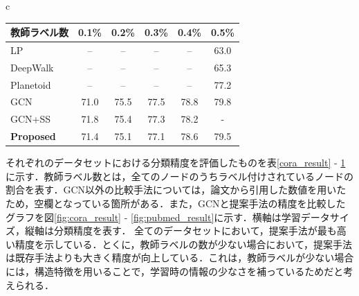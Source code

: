 \begin{table}[h]
\begin{center}
\begin{tabular}{c}
    
      
          \begin{minipage}{0.7\hsize}
        \begin{center}
\label{pubmed_result}
  \begin{tabular}{l|ccccc} \hline
    教師ラベル数 &  0.1\% & 0.2\% & 0.3\% & 0.4\% & 0.5\%  \\ \hline
     LP & -- & -- & -- & -- & 63.0 \\
    DeepWalk & -- & -- & -- & -- & 65.3 \\
    Planetoid & -- & -- & -- & -- & 77.2 \\ \hline \hline
    GCN & 71.0 & 75.5 & 77.5 & 78.8 & 79.8 \\
    GCN+SS & 71.8 & 75.4 & 77.3 & 78.2 & - \\
    {\bf Proposed} & 71.4 & 75.1 & 77.1 & 78.6 & 79.5 \\ \hline
  \end{tabular}
        \end{center}
      \end{minipage}

    \end{tabular}
  \end{center}
\end{table}



それぞれのデータセットにおける分類精度を評価したものを表\ref{cora_result} - \ref{pubmed_result}に示す．教師ラベル数とは，全てのノードのうちラベル付けされているノードの割合を表す．GCN以外の比較手法については，論文から引用した数値を用いたため，空欄となっている箇所がある．また，GCNと提案手法の精度を比較したグラフを図\ref{fig:cora_result} - \ref{fig:pubmed_result}に示す．横軸は学習データサイズ，縦軸は分類精度を表す．
全てのデータセットにおいて，提案手法が最も高い精度を示している．とくに，教師ラベルの数が少ない場合において，提案手法は既存手法よりも大きく精度が向上している．これは，教師ラベルが少ない場合には，構造特徴を用いることで，学習時の情報の少なさを補っているためだと考えられる．










